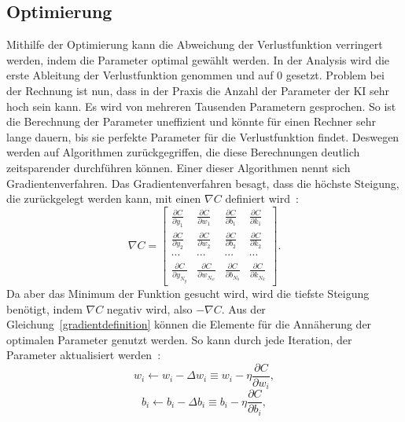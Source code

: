 \documentclass[11pt]{article}
\begin{document}
\subsection{Optimierung}\label{gradient}
Mithilfe der Optimierung kann die Abweichung der Verlustfunktion verringert werden, indem die Parameter optimal gewählt werden. In der Analysis
wird die erste Ableitung der Verlustfunktion genommen und auf $0$ gesetzt. Problem bei der Rechnung ist nun, dass in der Praxis die Anzahl der Parameter
der KI sehr hoch sein kann. Es wird von mehreren Tausenden Parametern gesprochen. So ist die Berechnung der Parameter uneffizient und könnte für einen
Rechner sehr lange dauern, bis sie perfekte Parameter für die Verlustfunktion findet. Deswegen werden auf Algorithmen zurückgegriffen, die diese
Berechnungen deutlich zeitsparender durchführen können. Einer dieser Algorithmen nennt sich Gradientenverfahren. Das Gradientenverfahren besagt, dass die höchste
Steigung, die zurückgelegt werden kann, mit einen $\nabla C$ definiert wird~\cite{5}:
\begin{equation}\label{gradientdefinition}
    \nabla C =
    \begin{bmatrix}
        \frac{\partial C}{\partial y_{1}} & \frac{\partial C}{\partial w_{1}} & \frac{\partial C}{\partial b_{1}} & \frac{\partial C}{\partial k_{1}}
        \\ \frac{\partial C}{\partial y_{2}} & \frac{\partial C}{\partial w_{2}} & \frac{\partial C}{\partial b_{2}} & \frac{\partial C}{\partial k_{2}}
        \\ \cdots & \cdots & \cdots & \cdots
        \\ \frac{\partial C}{\partial y_{N_y}} & \frac{\partial C}{\partial w_{N_w}} & \frac{\partial C}{\partial b_{N_b}} & \frac{\partial C}{\partial k_{N_k}}
    \end{bmatrix}.
\end{equation}
Da aber das Minimum der Funktion gesucht wird, wird die tiefste Steigung
benötigt, indem $\nabla C$ negativ wird, also $-\nabla C$. Aus der Gleichung~\ref{gradientdefinition} können die Elemente für die Annäherung der optimalen Parameter genutzt werden.
So kann durch jede Iteration, der Parameter aktualisiert werden~\cite{8}:
\begin{equation}
    w_i \leftarrow w_i - \Delta w_i \equiv  w_i - \eta \frac{\partial C}{\partial w_{i}},
\end{equation}
\begin{equation}
    b_i \leftarrow b_i - \Delta b_i \equiv  b_i - \eta \frac{\partial C}{\partial b_{i}},
\end{equation}
\end{document}
